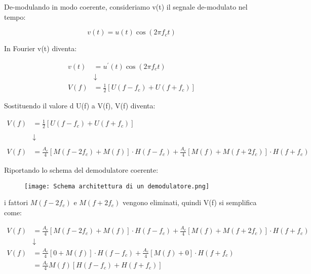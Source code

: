 De-modulando in modo coerente, consideriamo v(t) il segnale de-modulato nel tempo: 

{
    \Large 
    \begin{equation}
        v(t) = u(t) \cos(2 \pi f_c t)
    \end{equation}
}

In Fourier v(t) diventa: 

{
    \Large 
    \begin{equation}
        \begin{split}
           v(t) &= u^{'}(t) \cos(2 \pi f_c t)
           \\
           &\downarrow 
           \\
           V(f) &= \frac{1}{2} \left[ U(f - f_c) + U(f + f_c)\right] 
        \end{split}
    \end{equation}
}

Sostituendo il valore d U(f) a V(f), V(f) diventa: 

{
    \Large 
    \begin{equation}
        \begin{split}
             V(f) &= \frac{1}{2} \left[ U(f - f_c) + U(f + f_c)\right] 
             \\
             &\quad
             \\
             &\downarrow
             \\
             &\quad
             \\
             V(f) &= 
             \frac{A_c}{4} \left[ M(f- 2 f_c) + M(f)\right] \cdot H(f - f_c)
             +
            \frac{A_c}{4} \left[ M(f) + M(f + 2 f_c) \right] \cdot H(f + f_c)
        \end{split}
    \end{equation}
}

Riportando lo schema del demodulatore coerente: 

\begin{figure}[h]
    \centering
    \texttt{[image: Schema architettura di un demodulatore.png]}
\end{figure} 

i fattori $M(f- 2 f_c)$ e $M(f + 2 f_c)$ vengono eliminati, quindi V(f) si semplifica come: 

{
    \Large 
    \begin{equation}
        \begin{split}
             V(f) &= 
             \frac{A_c}{4} \left[ M(f- 2 f_c) + M(f)\right] \cdot H(f - f_c)
             +
            \frac{A_c}{4} \left[ M(f) + M(f + 2 f_c) \right] \cdot H(f + f_c)
            \\
            &\downarrow
            \\
            V(f) &= 
             \frac{A_c}{4} \left[ 0 + M(f)\right] \cdot H(f - f_c)
             +
            \frac{A_c}{4} \left[ M(f) + 0 \right] \cdot H(f + f_c)
            \\
            &= 
            \frac{A_c}{4} M(f) \left[ H(f - f_c) + H(f + f_c)\right]
        \end{split}
    \end{equation}
}

